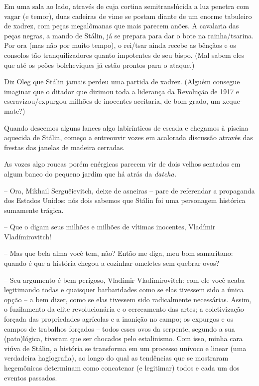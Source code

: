 Em uma sala ao lado, através de cuja cortina semitranslúcida a luz
penetra com vagar (e temor), duas cadeiras de vime se postam diante de
um enorme tabuleiro de xadrez, com peças megalômanas que mais parecem
anões. A cavalaria das peças negras, a mando de Stálin, já se prepara
para dar o bote na rainha/tsarina. Por ora (mas não por muito tempo), o
rei/tsar ainda recebe as bênçãos e os consolos tão tranquilizadores
quanto impotentes de seu bispo. (Mal sabem eles que até os peões
bolcheviques já estão prontos para o ataque.)

Diz Oleg que Stálin jamais perdeu uma partida de xadrez. (Alguém
consegue imaginar que o ditador que dizimou toda a liderança da
Revolução de 1917 e escravizou/expurgou milhões de inocentes aceitaria,
de bom grado, um xeque-mate?)

Quando descemos alguns lances algo labirínticos de escada e chegamos à
piscina aquecida de Stálin, começo a entreouvir vozes em acalorada
discussão através das frestas das janelas de madeira cerradas.

As vozes algo roucas porém enérgicas parecem vir de dois velhos sentados
em algum banco do pequeno jardim que há atrás da \emph{datcha. }

-- Ora, Mikhail Serguêievitch, deixe de asneiras -- pare de referendar a
propaganda dos Estados Unidos: nós dois sabemos que Stálin foi uma
personagem histórica sumamente trágica.

-- Que o digam seus milhões e milhões de vítimas inocentes, Vladímir
Vladímirovitch!

-- Mas que bela alma você tem, não? Então me diga, meu bom samaritano:
quando é que a história chegou a cozinhar omeletes sem quebrar ovos?

-- Seu argumento é bem perigoso, Vladímir Vladímirovitch: com ele você
acaba legitimando todas e quaisquer barbaridades como se elas tivessem
sido a única opção -- a bem dizer, como se elas tivessem sido
radicalmente necessárias. Assim, o fuzilamento da elite revolucionária e
o cerceamento das artes; a coletivização forçada das propriedades
agrícolas e a inanição no campo; os expurgos e os campos de trabalhos
forçados -- todos esses ovos da serpente, segundo a sua (pato)lógica,
tiveram que ser chocados pelo estalinismo. Com isso, minha cara viúva de
Stálin, a história se transforma em um processo unívoco e linear (uma
verdadeira hagiografia), ao longo do qual as tendências que se mostraram
hegemônicas determinam como concatenar (e legitimar) todos e cada um dos
eventos passados.

